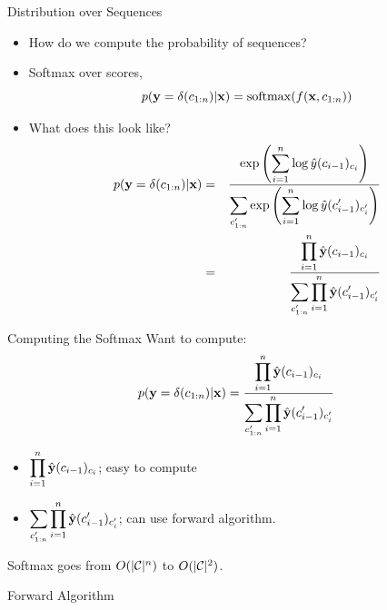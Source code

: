 \documentclass{beamer}
\begin{document}
\begin{frame}{Distribution over Sequences}

  \begin{itemize}
  \item 
  How do we compute the probability of sequences?

  \item Softmax over scores,
    \[ p(\boldy = \delta(c_{1:n}) | \boldx ) =  \softmax(f(\boldx, c_{1:n}))    \] 

  \item What does this look like?
  \begin{eqnarray*}
    p(\mathbf{y}=\delta(c_{1:n}) | \mathbf{x} ) &=& \displaystyle \frac{\displaystyle \exp \left( \sum_{i=1}^n \log \hat{y}(c_{i-1})_{c_{i}}\right) }{\displaystyle \sum_{c'_{1:n}} \exp\left(\sum_{i=1}^n \log \hat{y}(c'_{i-1})_{c'_{i}} \right) }  \\       
    &=& \frac{\displaystyle \prod_{i=1}^n \hat{\mathbf{y}}(c_{i-1})_{c_i}} { \displaystyle \sum_{c'_{1:n}} \prod_{i=1}^n \hat{\mathbf{y}}(c'_{i-1})_{c'_i} }
  \end{eqnarray*}
\end{itemize}
 \end{frame}


 \begin{frame}{Computing the Softmax}
   Want to compute:
   \[ p(\mathbf{y}=\delta(c_{1:n}) | \mathbf{x}) = \frac{\displaystyle \prod_{i=1}^n \hat{\mathbf{y}}(c_{i-1})_{c_i}} {\displaystyle  \sum_{c'_{1:n}} \prod_{i=1}^n \hat{\mathbf{y}}(c'_{i-1})_{c'_i} }\] 

   \begin{itemize}
   \item $\displaystyle \prod_{i=1}^n \hat{\mathbf{y}}(c_{i-1})_{c_i}$; easy to compute
     \air 
   \item $\displaystyle \sum_{c'_{1:n}} \prod_{i=1}^n \hat{\mathbf{y}}(c'_{i-1})_{c'_i}$; can use forward algorithm.
   \end{itemize}

   Softmax goes from $O(|\mathcal{C}|^n)$ to $O(|\mathcal{C}|^2)$.  
 \end{frame}

\begin{frame}{Forward Algorithm}
  \begin{algorithmic}
    \EndFor{}
    \EndFor{}
    \State{\Return{$\alpha$}}
    \EndProcedure{}
  \end{algorithmic}
\end{frame}
\end{document}
